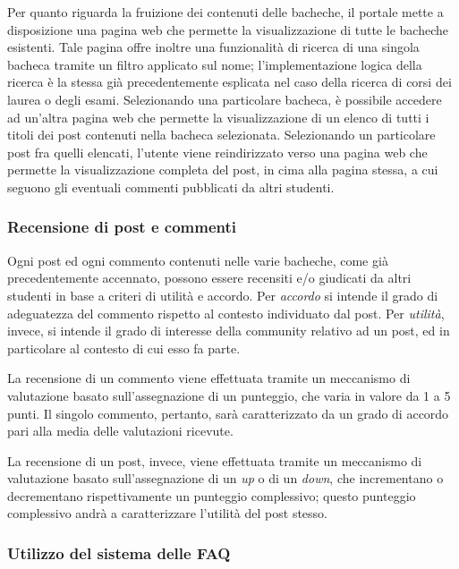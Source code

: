 \documentclass [a4paper,11pt]{book}
\begin{document}
\medskip

Per quanto riguarda la fruizione dei contenuti delle bacheche, il portale mette a disposizione una pagina web che permette la visualizzazione di tutte le bacheche esistenti. Tale pagina offre inoltre una funzionalità di ricerca di una singola bacheca tramite un filtro applicato sul nome; l'implementazione logica della ricerca è la stessa già precedentemente esplicata nel caso della ricerca di corsi dei laurea o degli esami. Selezionando una particolare bacheca, è possibile accedere ad un'altra pagina web che permette la visualizzazione di un elenco di tutti i titoli dei post contenuti nella bacheca selezionata. Selezionando un particolare post fra quelli elencati, l'utente viene reindirizzato verso una pagina web che permette la visualizzazione completa del post, in cima alla pagina stessa, a cui seguono gli eventuali commenti pubblicati da altri studenti. 

\medskip

\subsubsection{Recensione di post e commenti}

Ogni post ed ogni commento contenuti nelle varie bacheche, come già precedentemente accennato, possono essere recensiti e/o giudicati da altri studenti in base a criteri di utilità e accordo. Per \emph{accordo} si intende il grado di adeguatezza del commento rispetto al contesto individuato dal post. Per \emph{utilità}, invece, si intende il grado di interesse della community relativo ad un post, ed in particolare al contesto di cui esso fa parte.

La recensione di un commento viene effettuata tramite un meccanismo di valutazione basato sull'assegnazione di un punteggio, che varia in valore da 1 a 5 punti. Il singolo commento, pertanto, sarà caratterizzato da un grado di accordo pari alla media delle valutazioni ricevute.

La recensione di un post, invece, viene effettuata tramite un meccanismo di valutazione basato sull'assegnazione di un \emph{up} o di un \emph{down}, che incrementano o decrementano rispettivamente un punteggio complessivo; questo punteggio complessivo andrà a caratterizzare l'utilità del post stesso.

\medskip

\subsubsection{Utilizzo del sistema delle FAQ}
\end{document}
